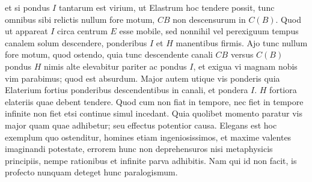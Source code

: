 et si pondus $I$ tantarum est virium, ut Elastrum hoc tendere possit,
tunc omnibus sibi relictis nullum fore motum,
$CB$ non descensurum in $C(B)$.
Quod ut appareat
%
{}
$I$ circa centrum $E$ esse mobile,
sed nonnihil vel perexiguum tempus canalem solum descendere,
ponderibus $I$ et $H$ manentibus firmis.
Ajo tunc nullum fore motum, quod ostendo, quia tunc descendente canali $CB$ versus $C(B)$
pondus $H$ nimis alte elevabitur pariter ac pondus $I$, et exigua vi magnam nobis vim parabimus;
quod est absurdum. Major autem utique vis ponderis
quia Elaterium fortius ponderibus descendentibus in canali,
et pondera $I.$ $H$ fortiora elateriis quae debent tendere.
Quod cum non fiat in tempore, nec fiet in tempore infinite
non fiet etsi continue simul incedant.
Quia quolibet momento paratur vis major quam quae adhibetur; seu effectus potentior causa.
Elegans est hoc exemplum quo ostenditur, homines etiam ingeniosissimos, et maxime valentes imaginandi potestate,
errorem hunc non deprehensuros nisi metaphysicis principiis, nempe rationibus
et infinite parva adhibitis.
Nam qui id non facit, is profecto nunquam deteget hunc paralogismum.
\pend
\count{}
\count{}
\count{}
